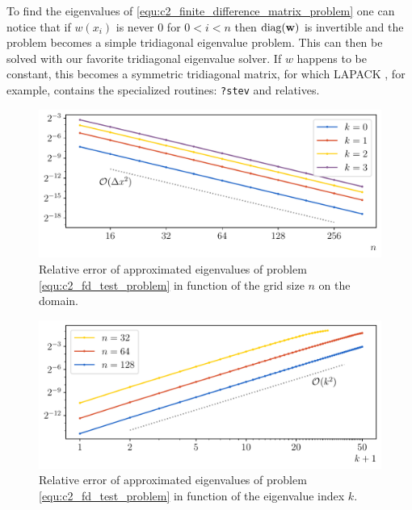 To find the eigenvalues of \eqref{equ:c2_finite_difference_matrix_problem} one can notice that if $w(x_i)$ is never $0$ for $0 < i < n$ then $\operatorname{diag}(\vb{w})$ is invertible and the problem becomes a simple tridiagonal eigenvalue problem. This can then be solved with our favorite tridiagonal eigenvalue solver. If $w$ happens to be constant, this becomes a symmetric tridiagonal matrix, for which LAPACK \cite{lapack}, for example, contains the specialized routines: \texttt{?stev} and relatives.

\begin{figure}
    \begin{center}
        \includegraphics[width=\textwidth]{img/chapter2/finite_difference_h_error.pdf}
    \end{center}
    \caption{Relative error of approximated eigenvalues of problem \eqref{equ:c2_fd_test_problem} in function of the grid size $n$ on the domain.}
    \label{fig:c2_fd_h_error}
\end{figure}

\begin{figure}
    \begin{center}
        \includegraphics[width=\textwidth]{img/chapter2/finite_difference_k_error.pdf}
    \end{center}
    \caption{Relative error of approximated eigenvalues of problem \eqref{equ:c2_fd_test_problem} in function of the eigenvalue index $k$.}
    \label{fig:c2_fd_k_error}
\end{figure}

